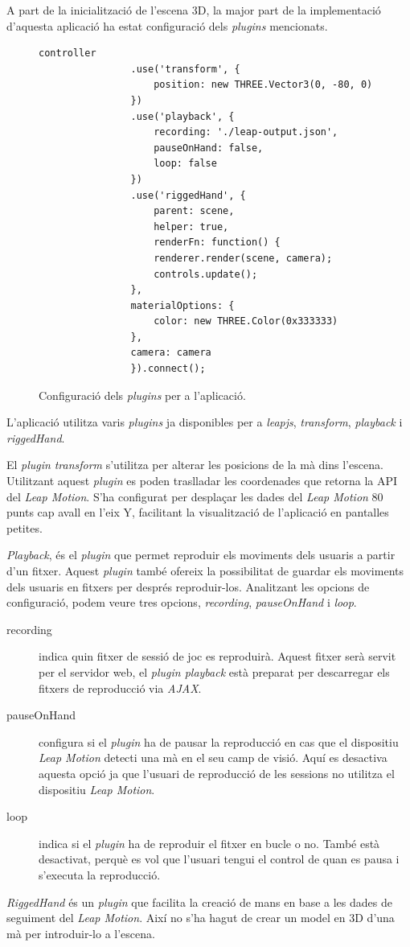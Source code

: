 \documentclass[12pt,a4paper,catalan]{article}
\begin{document}
	A part de la inicialització de l'escena 3D, la major part de la implementació d'aquesta aplicació ha estat configuració dels \textit{plugins} mencionats.
	\begin{figure}[H]
		\begin{lstlisting}[gobble=12, tabsize=4]
			controller
				.use('transform', {
					position: new THREE.Vector3(0, -80, 0)
				})
				.use('playback', {
					recording: './leap-output.json',
					pauseOnHand: false,
					loop: false
				})
				.use('riggedHand', {
					parent: scene,
					helper: true,
					renderFn: function() {
					renderer.render(scene, camera);
					controls.update();
				},
				materialOptions: {
					color: new THREE.Color(0x333333)
				},
				camera: camera
				}).connect();
		\end{lstlisting}
		\caption{Configuració dels \textit{plugins} per a l'aplicació.}
		\label{fig:monitoring-web}
	\end{figure}
	L'aplicació utilitza varis \textit{plugins} ja disponibles per a \textit{leapjs}, \textit{transform}, \textit{playback} i \textit{riggedHand}.
	
	El \textit{plugin} \textit{transform} s'utilitza per alterar les posicions de la mà dins l'escena. Utilitzant aquest \textit{plugin} es poden traslladar les coordenades que retorna la API del \textit{Leap Motion}. S'ha configurat per desplaçar les dades del \textit{Leap Motion} 80 punts cap avall en l'eix Y, facilitant la visualització de l'aplicació en pantalles petites.
	
	\textit{Playback}, és el \textit{plugin} que permet reproduir els moviments dels usuaris a partir d'un fitxer. Aquest \textit{plugin} també ofereix la possibilitat de guardar els moviments dels usuaris en fitxers per després reproduir-los.
	Analitzant les opcions de configuració, podem veure tres opcions, \textit{recording}, \textit{pauseOnHand} i \textit{loop}.
	\begin{description}
		\item[recording] indica quin fitxer de sessió de joc es reproduirà. Aquest fitxer serà servit per el servidor web, el \textit{plugin playback} està preparat per descarregar els fitxers de reproducció via \textit{AJAX}.
		\item[pauseOnHand] configura si el \textit{plugin} ha de pausar la reproducció en cas que el dispositiu \textit{Leap Motion} detecti una mà en el seu camp de visió. Aquí es desactiva aquesta opció ja que l'usuari de reproducció de les sessions no utilitza el dispositiu \textit{Leap Motion}.
		\item[loop] indica si el \textit{plugin} ha de reproduir el fitxer en bucle o no. També està desactivat, perquè es vol que l'usuari tengui el control de quan es pausa i s'executa la reproducció.
	\end{description}
	\textit{RiggedHand} és un \textit{plugin} que facilita la creació de mans en base a les dades de seguiment del \textit{Leap Motion}. Així no s'ha hagut de crear un model en 3D d'una mà per introduir-lo a l'escena.
	
\end{document}
